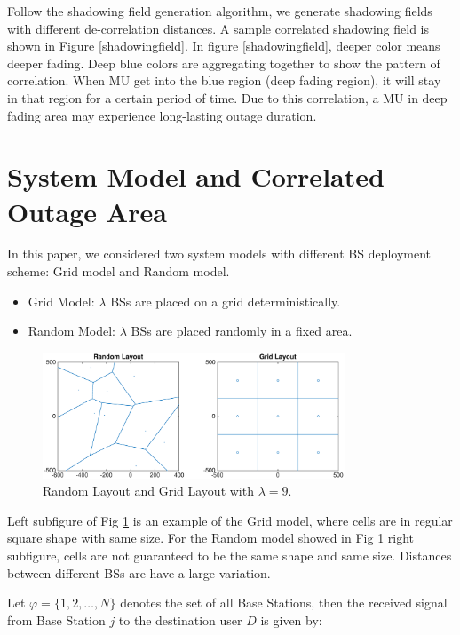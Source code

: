 \documentclass[journal,comsoc]{IEEEtran}
\begin{document}
Follow the shadowing field generation algorithm, we generate shadowing fields with different  de-correlation distances. A sample correlated shadowing field is shown in Figure \ref{shadowingfield}. In figure \ref{shadowingfield}, deeper color means deeper fading. Deep blue colors are aggregating together to show the pattern of correlation. When MU get into the blue region (deep fading region), it will stay in that region for a certain period of time. Due to this correlation, a MU in deep fading area may experience long-lasting outage duration.

\section{System Model and Correlated Outage Area}
\label{SystemModel}
In this paper, we considered two system models with different BS deployment scheme: Grid model and Random model.
\begin{itemize}
\item Grid Model: $\lambda$ BSs are placed on a grid deterministically.
\item Random Model: $\lambda$ BSs are placed randomly in a fixed area.
\end{itemize}
\begin{figure}
\centering
\includegraphics[width=9cm]{systemLayout.eps}
\caption{Random Layout and Grid Layout with $\lambda = 9$.}
\label{RandomLayout}
\end{figure}
Left subfigure of Fig \ref{RandomLayout} is an example of the Grid model, where cells are in regular square shape with same size. For the Random model showed in Fig \ref{RandomLayout} right subfigure, cells are not guaranteed to be the same shape and same size. Distances between different BSs are have a large variation. 
\par Let $\varphi = \{1, 2, \dots, N\}$ denotes the set of all Base Stations, then the received signal from Base Station $j$ to the destination user $D$ is given by:
\end{document}
